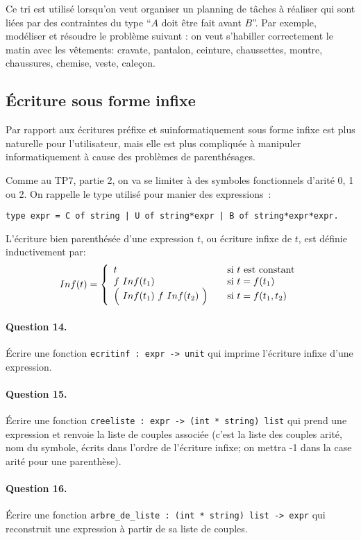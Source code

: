 \documentclass[10pt,a4paper]{article}
\begin{document}
Ce tri est utilisé lorsqu'on veut organiser un planning de tâches à réaliser qui 
sont liées par des contraintes du type ``$A$ doit être fait avant $B$''. Par exemple, 
modéliser et résoudre le problème suivant : on veut s'habiller correctement le matin 
avec les vêtements: cravate, pantalon, ceinture, chaussettes, montre, chaussures, 
chemise, veste, caleçon.

\subsection{Écriture sous forme infixe}
Par rapport aux écritures préfixe et suinformatiquement sous forme infixe est plus naturelle pour l'utilisateur, mais elle est 
plus compliquée à manipuler informatiquement à cause des problèmes de parenthésages.

Comme au TP7, partie 2, on va se limiter à des symboles fonctionnels d'arité 0, 1 ou 
2. On rappelle le type utilisé pour manier des expressions :
\begin{verbatim}type expr = C of string | U of string*expr | B of string*expr*expr.\end{verbatim}
L'écriture bien parenthésée d'une expression $t$, ou écriture infixe de $t$, est 
définie inductivement par:
\[Inf(t)=\left\lbrace
\begin{array}{lcl}
t & & \mathrm{si} \ t \ \mathrm{est \ constant}\\
f \ Inf(t_1) & & \mathrm{si} \ t = f(t_1)\\
\Big ( \normalsize \ Inf(t_1) \ f \ Inf(t_2) \ \Big ) \normalsize & & \mathrm{si} \ t = f(t_1,t_2)
\end{array}\right.\]
\paragraph{Question 14.} Écrire une fonction \texttt{ecritinf : expr -> unit} qui 
imprime l'écriture infixe d'une expression.
\paragraph{Question 15.} Écrire une fonction \texttt{creeliste : expr -> (int * string) list} 
qui prend une expression et renvoie la liste de couples associée (c'est la liste 
des couples arité, nom du symbole, écrits dans l'ordre de l'écriture infixe; on mettra 
-1 dans la case arité pour une parenthèse).
\paragraph{Question 16.} Écrire une fonction \texttt{arbre\_de\_liste : (int * string) list -> expr} 
qui reconstruit une expression à partir de sa liste de couples.
\end{document}
